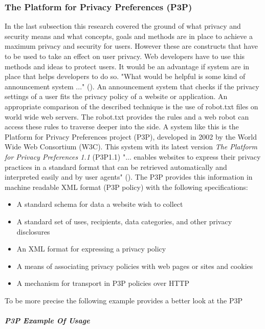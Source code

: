 \subsubsection{The Platform for Privacy Preferences (P3P)}

In the last subsection this research covered the ground of what privacy and security means and what concepts, goals and methods are in place to achieve a maximum privacy and security for users. However these are constructs that have to be used to take an effect on user privacy. Web developers have to use this methods and ideas to protect users. It would be an advantage if system are in place that helps developers to do so. "What would be helpful is some kind of announcement system ..." (\cite{langheinrich2001privacy}). An announcement system that checks if the privacy settings of a user fits the privacy policy of a website or application. An appropriate comparison of the described technique is the use of robot.txt files on world wide web servers. The robot.txt provides the rules and a web robot can access these rules to traverse deeper into the side. A system like this is the Platform for Privacy Preferences project (P3P), developed in 2002 by the World Wide Web Consortium (W3C). This system with its latest version \textit{The Platform for Privacy Preferences 1.1} (P3P1.1) "... enables websites to express their privacy practices in a standard format that can be retrieved automatically and interpreted easily and by user agents" (\cite{cranor2002platform}). The P3P provides this information in machine readable XML format (P3P policy) with the following specifications:

\begin{itemize}
  \item A standard schema for data a website wish to collect
  \item A standard set of uses, recipients, data categories, and other privacy disclosures
  \item An XML format for expressing a privacy policy
  \item A means of associating privacy policies with web pages or sites and cookies
  \item A mechanism for transport in P3P policies over HTTP
\end{itemize} \cite{cranorplatform}

To be more precise the following example provides a better look at the P3P

\subparagraph{P3P Example Of Usage}

